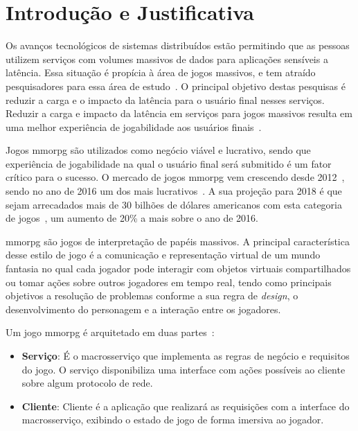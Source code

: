 \section{Introdução e Justificativa}
\label{sec:int}

Os avanços tecnológicos de sistemas distribuídos estão permitindo que as pessoas utilizem serviços com volumes massivos de dados para aplicações sensíveis a latência.
%
Essa situação é propícia à área de jogos massivos, e tem atraído pesquisadores para essa área de estudo~\cite{mmo_analytic,1417630,6267019,6063041}.
%
O principal objetivo destas pesquisas é reduzir a carga e o impacto da latência para o usuário final nesses serviços.
%
Reduzir a carga e impacto da latência em serviços para jogos massivos resulta em uma melhor experiência de jogabilidade aos usuários finais~\cite{1417630}.


Jogos \ac{mmorpg} são utilizados como negócio viável e lucrativo, sendo que experiência de jogabilidade na qual o usuário final será submitido é um fator crítico para o sucesso.
%
O mercado de jogos \ac{mmorpg} vem crescendo desde 2012~\cite{new_york_times}, sendo no ano de 2016 um dos mais lucrativos~\cite{statista_2016}.
%
A sua projeção para 2018 é que sejam arrecadados mais de 30 bilhões de dólares americanos com esta categoria de jogos~\cite{statista_2018}, um aumento de 20\% a mais sobre o ano de 2016.



\ac{mmorpg} são jogos de interpretação de papéis massivos.
%
A principal característica desse estilo de jogo é a comunicação e representação virtual de um mundo fantasia no qual cada jogador pode interagir com objetos virtuais compartilhados ou tomar ações sobre outros jogadores em tempo real, tendo como principais objetivos a resolução de problemas conforme a sua regra de \textit{design}, o desenvolvimento do personagem e a interação entre os jogadores\cite{video_game_technologies}.
%

Um jogo \ac{mmorpg} é arquitetado em duas partes~\cite{mmo_analytic}:
\begin{itemize}
  \item \textbf{Serviço}: É o macrosserviço que implementa as regras de negócio e requisitos do jogo.
  O serviço disponibiliza uma interface com ações possíveis ao cliente sobre algum protocolo de rede.
  \item \textbf{Cliente}: Cliente é a aplicação que realizará as requisições com a interface do macrosserviço, exibindo o estado de jogo de forma imersiva ao jogador.
\end{itemize}

